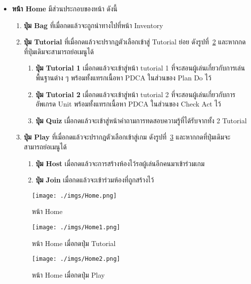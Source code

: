 \documentclass[12pt,oneside,openright,a4paper]{cpe-thai-project}
\begin{document}
\begin{enumerate}
    \begin{itemize}
      \item \textbf{หน้า Home} มีส่วนประกอบของหน้า ดังนี้ 
      \begin{enumerate}
        \item \textbf{ปุ่ม Bag} ที่เมื่อกดแล้วจะถูกนำทางไปที่หน้า Inventory 
        \item \textbf{ปุ่ม Tutorial} ที่เมื่อกดแล้วจะปรากฎตัวเลือกเข้าสู่ Tutorial ย่อย ดังรูปที่~\ref{fig:Home1} และหากกดที่ปุ่มเดิมจะสามารถย่อเมนูได้
        \begin{enumerate}
          \item \textbf{ปุ่ม Tutorial 1} เมื่อกดแล้วจะเข้าสู่หน้า tutorial 1 ที่จะสอนผู้เล่นเกี่ยวกับการเล่นพื้นฐานต่าง ๆ พร้อมทั้งแทรกเนื้อหา PDCA ในส่วนของ Plan Do ไว้
          \item \textbf{ปุ่ม Tutorial 2} เมื่อกดแล้วจะเข้าสู่หน้า tutorial 2 ที่จะสอนผู้เล่นเกี่ยวกับการอัพเกรด Unit พร้อมทั้งแทรกเนื้อหา PDCA ในส่วนของ Check Act ไว้
          \item \textbf{ปุ่ม Quiz} เมื่อกดแล้วจะเข้าสู่หน้าคำถามการทดสอบความรู้ที่ได้รับจากทั้ง 2 Tutorial
        \end{enumerate}
        \item \textbf{ปุ่ม Play} ที่เมื่อกดแล้วจะปรากฎตัวเลือกเข้าสู่เกม ดังรูปที่~\ref{fig:Home2} และหากกดที่ปุ่มเดิมจะสามารถย่อเมนูได้
        \begin{enumerate}
          \item \textbf{ปุ่ม Host} เมื่อกดแล้วจะการสร้างห้องไว้รอผู้เล่นอีกคนมาเข้าร่วมเกม
          \item \textbf{ปุ่ม Join} เมื่อกดแล้วจะเข้าร่วมห้องที่ถูกสร้างไว้
        \end{enumerate}
      \end{enumerate}

      \begin{figure}[H]\centering
        \texttt{[image: ./imgs/Home.png]}
        \caption{หน้า Home}\label{fig:Home}
      \end{figure}

      \begin{figure}[H]\centering
        \texttt{[image: ./imgs/Home1.png]}
        \caption{หน้า Home เมื่อกดปุ่ม Tutorial}\label{fig:Home1}
      \end{figure}

      \begin{figure}[H]\centering
        \texttt{[image: ./imgs/Home2.png]}
        \caption{หน้า Home เมื่อกดปุ่ม Play}\label{fig:Home2}
      \end{figure}
      

\end{itemize}
\end{enumerate}
\end{document}
